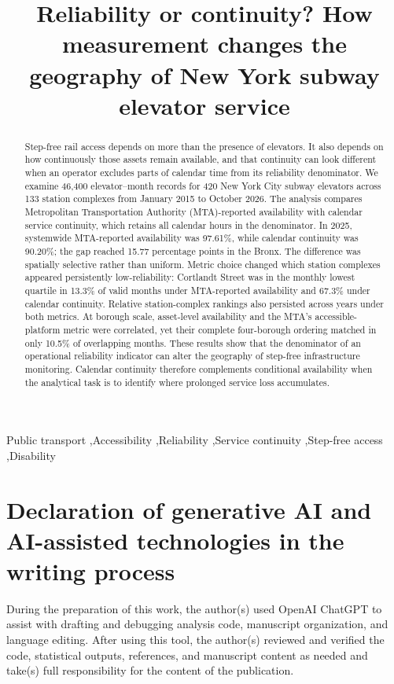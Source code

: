 \documentclass[preprint,12pt,authoryear,doubleblind]{elsarticle}
\begin{document}
\begin{frontmatter}

\title{Reliability or continuity? How measurement changes the geography of New York subway elevator service}


\begin{abstract}
Step-free rail access depends on more than the presence of elevators. It also depends on how continuously those assets remain available, and that continuity can look different when an operator excludes parts of calendar time from its reliability denominator. We examine 46,400 elevator--month records for 420 New York City subway elevators across 133 station complexes from January 2015 to October 2026. The analysis compares Metropolitan Transportation Authority (MTA)-reported availability with calendar service continuity, which retains all calendar hours in the denominator. In 2025, systemwide MTA-reported availability was 97.61\%, while calendar continuity was 90.20\%; the gap reached 15.77 percentage points in the Bronx. The difference was spatially selective rather than uniform. Metric choice changed which station complexes appeared persistently low-reliability: Cortlandt Street was in the monthly lowest quartile in 13.3\% of valid months under MTA-reported availability and 67.3\% under calendar continuity. Relative station-complex rankings also persisted across years under both metrics. At borough scale, asset-level availability and the MTA's accessible-platform metric were correlated, yet their complete four-borough ordering matched in only 10.5\% of overlapping months. These results show that the denominator of an operational reliability indicator can alter the geography of step-free infrastructure monitoring. Calendar continuity therefore complements conditional availability when the analytical task is to identify where prolonged service loss accumulates.
\end{abstract}

\begin{keyword}
Public transport \sep Accessibility \sep Reliability \sep Service continuity \sep Step-free access \sep Disability
\end{keyword}

\end{frontmatter}
\linenumbers






\section*{Declaration of generative AI and AI-assisted technologies in the writing process}
During the preparation of this work, the author(s) used OpenAI ChatGPT to assist with drafting and debugging analysis code, manuscript organization, and language editing. After using this tool, the author(s) reviewed and verified the code, statistical outputs, references, and manuscript content as needed and take(s) full responsibility for the content of the publication.



\end{document}
